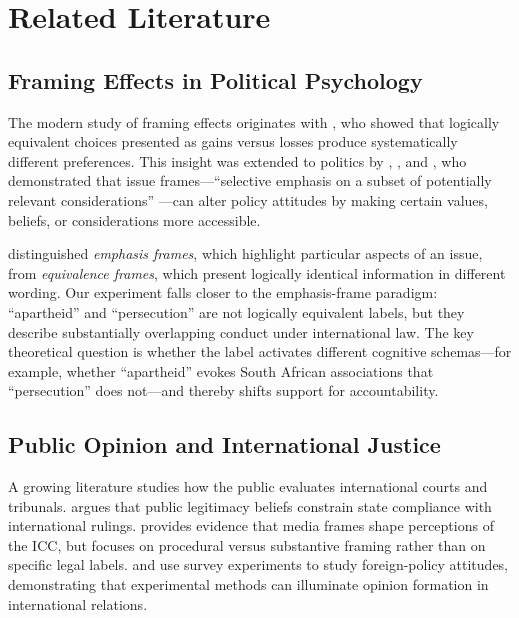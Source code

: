 \documentclass[12pt]{article}
\begin{document}
\section{Related Literature}
\label{sec:lit}

\subsection{Framing Effects in Political Psychology}

The modern study of framing effects originates with \citet{kahneman1979prospect}, who showed that logically equivalent choices presented as gains versus losses produce systematically different preferences. This insight was extended to politics by \citet{nelson1997toward}, \citet{druckman2001implications}, and \citet{chong2007framing}, who demonstrated that issue frames---``selective emphasis on a subset of potentially relevant considerations'' \citep[p.~104]{chong2007framing}---can alter policy attitudes by making certain values, beliefs, or considerations more accessible.

\citet{sniderman2004structure} distinguished \emph{emphasis frames}, which highlight particular aspects of an issue, from \emph{equivalence frames}, which present logically identical information in different wording. Our experiment falls closer to the emphasis-frame paradigm: ``apartheid'' and ``persecution'' are not logically equivalent labels, but they describe substantially overlapping conduct under international law. The key theoretical question is whether the label activates different cognitive schemas---for example, whether ``apartheid'' evokes South African associations that ``persecution'' does not---and thereby shifts support for accountability.

\subsection{Public Opinion and International Justice}

A growing literature studies how the public evaluates international courts and tribunals. \citet{voeten2013public} argues that public legitimacy beliefs constrain state compliance with international rulings. \citet{putnam2020framing} provides evidence that media frames shape perceptions of the ICC, but focuses on procedural versus substantive framing rather than on specific legal labels. \citet{tomz2007experimental} and \citet{kertzer2020experiments} use survey experiments to study foreign-policy attitudes, demonstrating that experimental methods can illuminate opinion formation in international relations.
\end{document}

